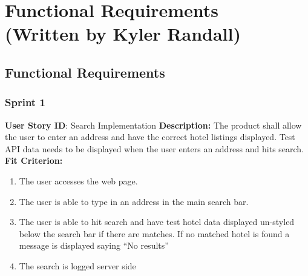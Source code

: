 \documentclass[]{article}
\begin{document}
\section{Functional Requirements \\ (Written by Kyler Randall)}
\subsection{Functional Requirements}
\subsubsection{Sprint 1}
\textbf{User Story ID}: Search Implementation\newline
\textbf{Description:} The product shall allow the user to enter an address and have the correct hotel listings displayed. Test API data needs to be displayed when the user enters an address and hits search. \newline
\textbf{Fit Criterion:}
\begin{enumerate}
    \item The user accesses the web page.
    \item The user is able to type in an address in the main search bar.
    \item The user is able to hit search and have test hotel data displayed un-styled below the search bar if there are matches. If no matched hotel is found a message is displayed saying “No results”
    \item The search is logged server side
\end{enumerate}
\end{document}
